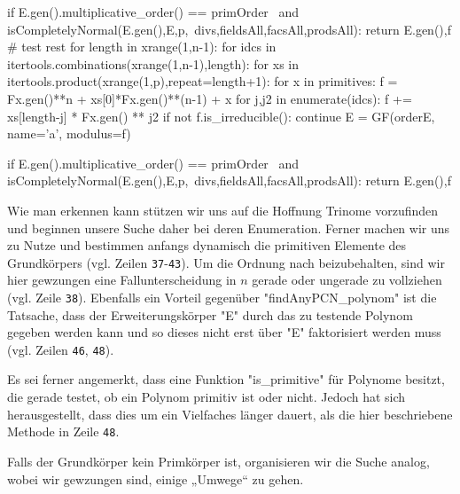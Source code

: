 \begin{sagecode}[caption={Aus \url{../Sage/findAnyPCN_trinom.spyx}},
  label=lst:findAnyPCN_polynom_prime]
                if E.gen().multiplicative_order() == primOrder \
                        and isCompletelyNormal(E.gen(),E,p,\
                            divs,fieldsAll,facsAll,prodsAll):
                    return E.gen(),f
    # test rest
    for length in xrange(1,n-1):
        for idcs in itertools.combinations(xrange(1,n-1),length):
            for xs in itertools.product(xrange(1,p),repeat=length+1):
                for x in primitives:
                    f = Fx.gen()**n + xs[0]*Fx.gen()**(n-1) + x
                    for j,j2 in enumerate(idcs):
                        f += xs[length-j] * Fx.gen() ** j2
                    if not f.is_irreducible(): continue
                    E = GF(orderE, name='a', modulus=f)

                    if E.gen().multiplicative_order() == primOrder \
                            and isCompletelyNormal(E.gen(),E,p,\
                                divs,fieldsAll,facsAll,prodsAll):
                        return E.gen(),f
\end{sagecode}

Wie man erkennen kann stützen wir uns auf die Hoffnung Trinome vorzufinden und
beginnen unsere Suche daher bei deren Enumeration. Ferner machen wir uns
 zu Nutze und bestimmen anfangs dynamisch die primitiven
Elemente des Grundkörpers (vgl. Zeilen \texttt{37}-\texttt{43}).
Um die Ordnung nach \thref{def:polynomordnung} beizubehalten, sind wir hier
gewzungen eine Fallunterscheidung in $n$ gerade oder ungerade zu vollziehen
(vgl. Zeile \texttt{38}). Ebenfalls ein Vorteil gegenüber 
"findAnyPCN_polynom" ist die Tatsache, dass der Erweiterungskörper "E"
durch das zu testende Polynom gegeben werden kann und so dieses nicht erst über
"E" faktorisiert werden muss (vgl. Zeilen \texttt{46}, \texttt{48}).

Es sei ferner angemerkt, dass \sage eine Funktion "is_primitive" für Polynome
besitzt, die gerade testet, ob ein Polynom primitiv ist oder nicht. Jedoch hat
sich herausgestellt, dass dies um ein Vielfaches länger dauert, als die hier
beschriebene Methode in Zeile \texttt{48}.


Falls der Grundkörper kein Primkörper ist, organisieren wir die Suche analog,
wobei wir gewzungen sind, einige „Umwege“ zu gehen.


